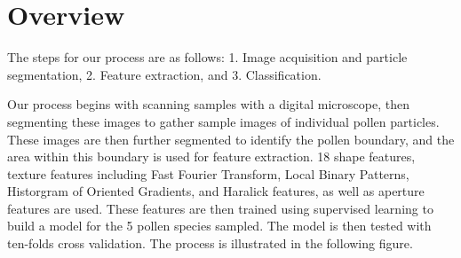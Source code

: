 \section{Overview} 

The steps for our process are as follows: 1. Image acquisition and particle segmentation, 2. Feature extraction, and 3. Classification.

Our process begins with scanning samples with a digital microscope, then segmenting these images to gather sample images of individual pollen particles. These images are then further segmented to identify the pollen boundary, and the area within this boundary is used for feature extraction. 18 shape features, texture features including Fast Fourier Transform, Local Binary Patterns, Historgram of Oriented Gradients, and Haralick features, as well as aperture features are used. These features are then trained using supervised learning to build a model for the 5 pollen species sampled. The model is then tested with ten-folds cross validation. The process is illustrated in the following figure. 
    
    
    
    
    
    
    
    
    
    
    
    
  
  
  
  
  
  
  
  
  